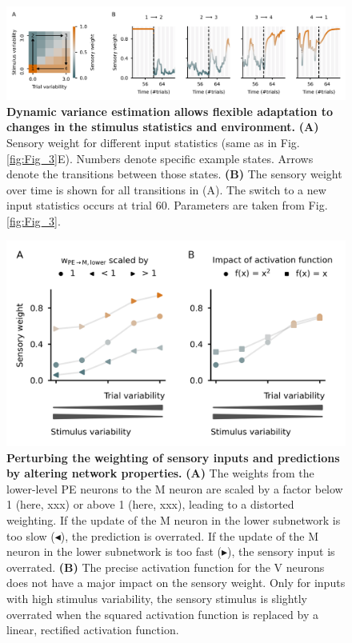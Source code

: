 \documentclass[10pt,a4paper]{article}
\begin{document}
\begin{figure}[!h]
	\centering
    \includegraphics{../results/figures/final/Fig_3_S1}%
\caption{\footnotesize{\bf Dynamic variance estimation allows flexible adaptation to changes in the stimulus statistics and environment. \newline}  
{\bf (A)} Sensory weight for different input statistics (same as in Fig. \ref{fig:Fig_3}E). Numbers denote specific example states. Arrows denote the transitions between those states.
{\bf (B)} The sensory weight over time is shown for all transitions in (A). The switch to a new input statistics occurs at trial 60. Parameters are taken from Fig. \ref{fig:Fig_3}.
}
\label{fig:Fig_3_S1}
\end{figure}


\begin{figure}[!h]
	\centering
    \includegraphics{../results/figures/final/Fig_3_S2}%
\caption{\footnotesize{\bf Perturbing the weighting of sensory inputs and predictions by altering  network properties. \newline}  
{\bf (A)} The weights from the lower-level PE neurons to the M neuron are scaled by a factor below 1 (here, xxx) or above 1 (here, xxx), leading to a distorted weighting. If the update of the M neuron in the lower subnetwork is too slow ($\blacktriangleleft$), the prediction is overrated. If the update of the M neuron in the lower subnetwork is too fast ($\blacktriangleright$), the sensory input is overrated.
{\bf (B)} The precise activation function for the V neurons does not have a major impact on the sensory weight. Only for inputs with high stimulus variability, the sensory stimulus is slightly overrated when the squared activation function is replaced by a linear, rectified activation function.
}
\label{fig:Fig_3_S2}
\end{figure}
\end{document}
